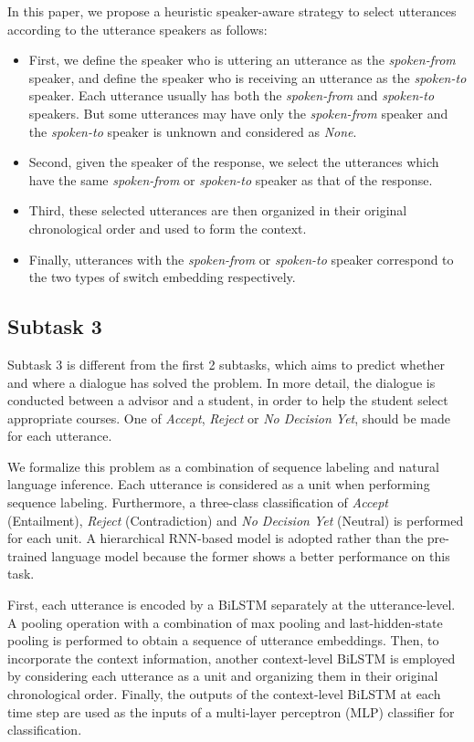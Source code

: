 \documentclass[letterpaper]{article} \usepackage{aaai20}  \usepackage{times}  \usepackage{helvet} \usepackage{courier}  \usepackage[hyphens]{url}  \usepackage{graphicx} \urlstyle{rm} \def\UrlFont{\rm}  \usepackage{graphicx}  \frenchspacing  \setlength{\pdfpagewidth}{8.5in}  \setlength{\pdfpageheight}{11in}
\begin{document}
    In this paper, we propose a heuristic speaker-aware strategy to select utterances according to the utterance speakers as follows:
    \begin{itemize}
      \item First, we define the speaker who is uttering an utterance as the \emph{spoken-from} speaker, and define the speaker who is receiving an utterance as the \emph{spoken-to} speaker.
          Each utterance usually has both the \emph{spoken-from} and \emph{spoken-to} speakers.
          But some utterances may have only the \emph{spoken-from} speaker and the \emph{spoken-to} speaker is unknown and considered as \emph{None}.
      \item Second, given the speaker of the response, we select the utterances which have the same \emph{spoken-from} or \emph{spoken-to} speaker as that of the response.
      \item Third, these selected utterances are then organized in their original chronological order and used to form the context.
      \item Finally, utterances with the \emph{spoken-from} or \emph{spoken-to} speaker correspond to the two types of switch embedding respectively.
    \end{itemize}


  \subsection{Subtask 3}
    Subtask 3 is different from the first 2 subtasks, which aims to predict whether and where a dialogue has solved the problem.
    In more detail, the dialogue is conducted between a advisor and a student, in order to help the student select appropriate courses.
    One of \emph{Accept}, \emph{Reject} or \emph{No Decision Yet}, should be made for each utterance.

    We formalize this problem as a combination of sequence labeling and natural language inference.
    Each utterance is considered as a unit when performing sequence labeling.
    Furthermore, a three-class classification of \emph{Accept} (Entailment), \emph{Reject} (Contradiction) and \emph{No Decision Yet} (Neutral) is performed for each unit.
    A hierarchical RNN-based model is adopted rather than the pre-trained language model because the former shows a better performance on this task.

    First, each utterance is encoded by a BiLSTM \cite{DBLP:journals/neco/HochreiterS97} separately at the utterance-level.
    A pooling operation with a combination of max pooling and last-hidden-state pooling is performed to obtain a sequence of utterance embeddings.
    Then, to incorporate the context information, another context-level BiLSTM is employed by considering each utterance as a unit and organizing them in their original chronological order.
    Finally, the outputs of the context-level BiLSTM at each time step are used as the inputs of a multi-layer perceptron (MLP) classifier for classification.
\end{document}
